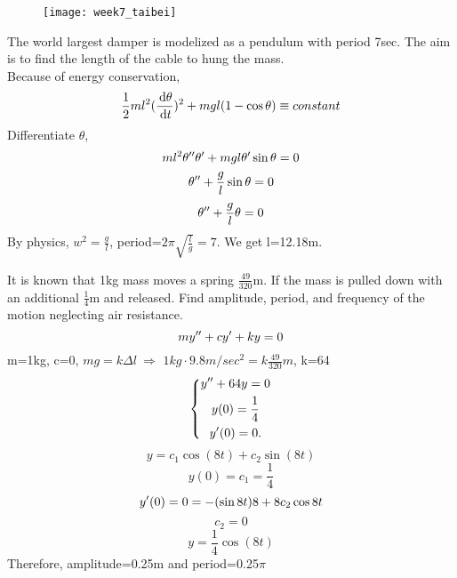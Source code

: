 \begin{example}
\begin{figure}[H]
\centering
\texttt{[image: week7\_taibei]}
\end{figure}

The world largest damper is modelized as a pendulum with period 7sec. The aim is to find the length of the cable to hung the mass.\\
Because of energy conservation,
\[\frac{1}{2}ml^2(\frac{\,\mathrm{d} \theta}{\,\mathrm{d} t})^2+mgl(1-\cos\theta)\equiv constant
\]
Differentiate $\theta$,
\[ml^2\theta^{\prime\prime}\theta^{\prime}+mgl\theta^{\prime}\sin\theta=0
\]
\[\theta^{\prime\prime}+\frac{g}{l}\sin\theta=0
\]
\[\theta^{\prime\prime}+\frac{g}{l}\theta=0
\]
By physics, $w^2=\frac{g}{l}$, period=$2\pi\sqrt{\frac{l}{g}}=7$. We get l=12.18m.
\end{example}
\begin{example}
It is known that 1kg mass moves a spring $ \frac{49}{320}$m. If the mass is pulled down with an additional $\frac{1}{4}$m and released. Find amplitude, period, and frequency of the motion neglecting air resistance.
\[my^{\prime\prime}+cy^{\prime}+ky=0
\]
m=1kg, c=0,  $mg=k\Delta l~\Rightarrow$ $1kg\cdot9.8m/ sec^2=k\frac{49}{320}m$,  k=64
\[\left \{	\begin{gathered}
y^{\prime\prime}+64y=0\\
y(0)=\frac{1}{4}\\
y^{\prime}(0)=0.
\end{gathered}\right.
\]
\[y=c_1\cos(8t)+c_2\sin(8t)
\]
\[y(0)=c_1=\frac{1}{4}
\]
\[y^{\prime}(0)=0=-(\sin8t)8+8c_2\cos8t
\]
\[c_2=0
\]
\[y=\frac{1}{4}\cos(8t)
\]
Therefore, amplitude=0.25m and period=0.25$\pi$

\end{example}



